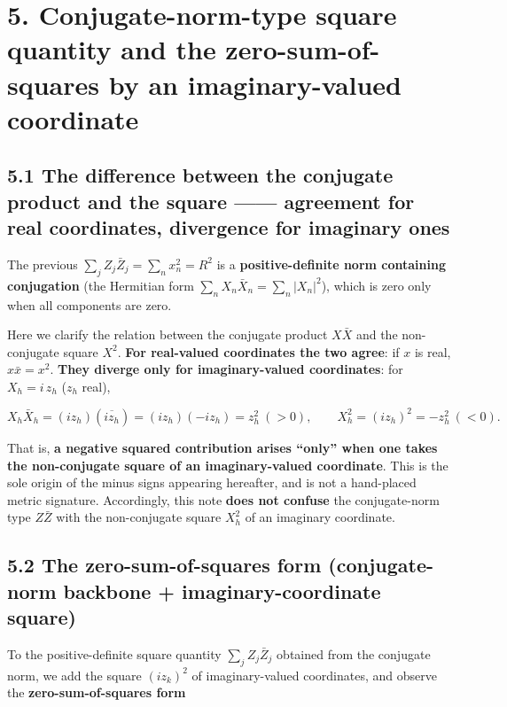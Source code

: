 \documentclass[11pt,a4paper]{article}
\begin{document}
\section{5. Conjugate-norm-type square quantity and the
zero-sum-of-squares by an imaginary-valued
coordinate}\label{conjugate-norm-type-square-quantity-and-the-zero-sum-of-squares-by-an-imaginary-valued-coordinate}

\subsection{5.1 The difference between the conjugate product and the
square ------ agreement for real coordinates, divergence for imaginary
ones}\label{the-difference-between-the-conjugate-product-and-the-square-agreement-for-real-coordinates-divergence-for-imaginary-ones}

The previous \(\sum_j Z_j\bar Z_j=\sum_n x_n^2=R^2\) is a
\textbf{positive-definite norm containing conjugation} (the Hermitian
form \(\sum_n X_n\bar X_n=\sum_n|X_n|^2\)), which is zero only when all
components are zero.

Here we clarify the relation between the conjugate product \(X\bar X\)
and the non-conjugate square \(X^2\). \textbf{For real-valued
coordinates the two agree}: if \(x\) is real, \(x\bar x=x^2\).
\textbf{They diverge only for imaginary-valued coordinates}: for
\(X_h=i\,z_h\) (\(z_h\) real),

\[
X_h\bar X_h=(i z_h)(\overline{i z_h})=(i z_h)(-i z_h)=z_h^2\ (>0),
\qquad
X_h^2=(i z_h)^2=-z_h^2\ (<0).
\]

That is, \textbf{a negative squared contribution arises ``only'' when
one takes the non-conjugate square of an imaginary-valued coordinate}.
This is the sole origin of the minus signs appearing hereafter, and is
not a hand-placed metric signature. Accordingly, this note \textbf{does
not confuse} the conjugate-norm type \(Z\bar Z\) with the non-conjugate
square \(X_h^2\) of an imaginary coordinate.

\subsection{5.2 The zero-sum-of-squares form (conjugate-norm backbone +
imaginary-coordinate
square)}\label{the-zero-sum-of-squares-form-conjugate-norm-backbone-imaginary-coordinate-square}

To the positive-definite square quantity \(\sum_j Z_j\bar Z_j\) obtained
from the conjugate norm, we add the square \((i z_k)^2\) of
imaginary-valued coordinates, and observe the
\textbf{zero-sum-of-squares form}
\end{document}
